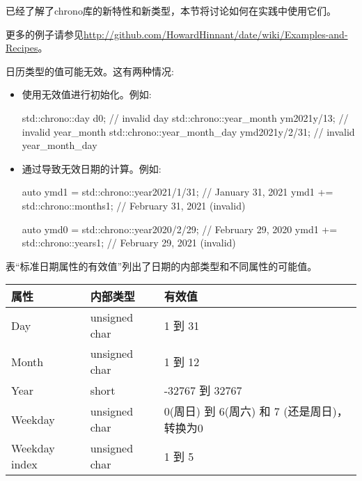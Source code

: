 
已经了解了chrono库的新特性和新类型，本节将讨论如何在实践中使用它们。

更多的例子请参见\url{http://github.com/HowardHinnant/date/wiki/Examples-and-Recipes}。


日历类型的值可能无效。这有两种情况:

\begin{itemize}
\item
使用无效值进行初始化。例如:

\begin{cpp}
std::chrono::day d{0}; // invalid day
std::chrono::year_month ym{2021y/13}; // invalid year_month
std::chrono::year_month_day ymd{2021y/2/31}; // invalid year_month_day
\end{cpp}

\item
通过导致无效日期的计算。例如:

\begin{cpp}
auto ymd1 = std::chrono::year{2021}/1/31; // January 31, 2021
ymd1 += std::chrono::months{1}; // February 31, 2021 (invalid)

auto ymd0 = std::chrono::year{2020}/2/29; // February 29, 2020
ymd1 += std::chrono::years{1}; // February 29, 2021 (invalid)
\end{cpp}
\end{itemize}

表“标准日期属性的有效值”列出了日期的内部类型和不同属性的可能值。

\begin{longtable}[c]{|l|l|l|}
\hline
\textbf{属性} & \textbf{内部类型} & \textbf{有效值}                                                  \\ \hline
\endfirsthead
%
\endhead
%
Day           & unsigned char & 1 到 31         \\ \hline
Month         & unsigned char & 1 到 12         \\ \hline
Year          & short         & -32767 到 32767 \\ \hline
Weekday            & unsigned char          & 0(周日) 到 6(周六) 和 7 (还是周日)，转换为0\\ \hline
Weekday index & unsigned char & 1 到 5          \\ \hline
\end{longtable}

